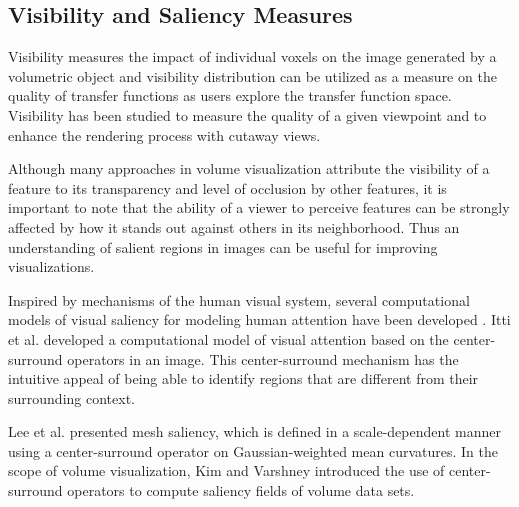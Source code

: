 \documentclass{egpubl}
\begin{document}
\subsection{Visibility and Saliency Measures}

Visibility measures the impact of individual voxels on the image generated by a volumetric object and visibility distribution can be utilized as a measure on the quality of transfer functions as users explore the transfer function space. Visibility has been studied to measure the quality of a given viewpoint \cite{bordoloi_view_2005} \cite{viola_importance-driven_2004} and to enhance the rendering process with cutaway views.

Although many approaches in volume visualization attribute the visibility of a feature to its transparency and level of occlusion by other features, it is important to note that the ability of a viewer to perceive features can be strongly affected by how it stands out against others in its neighborhood. Thus an understanding of salient regions in images \cite{zhao_learning_2013} can be useful for improving visualizations.

Inspired by mechanisms of the human visual system, several computational models of visual saliency for modeling human attention have been developed \cite{harel_graph-based_2006}.
Itti et al. \cite{itti_model_1998} developed a computational model of visual attention based on the center-surround operators in an image. This center-surround mechanism has the intuitive appeal of being able to identify regions that are different from their surrounding context.

Lee et al. \cite{lee_mesh_2005} presented mesh saliency, which is defined in a scale-dependent manner using a center-surround operator on Gaussian-weighted mean curvatures.
In the scope of volume visualization, Kim and Varshney \cite{kim_saliency-guided_2006} introduced the use of center-surround operators to compute saliency fields of volume data sets.
\end{document}

